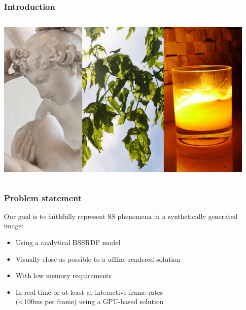 \documentclass{beamer}
\begin{document}
\begin{frame}
    \frametitle{Introduction}
\begin{columns}[t]
    \begin{column}{\paperwidth}
      \centering
		\vspace{0.0cm}
		\includegraphics[width=\paperwidth]{comb}
\end{column}
​\end{columns}
\end{frame}

\begin{frame}
    \frametitle{Problem statement}
		Our goal is to faithfully represent SS phenomena in a synthetically generated image:
		\vspace{0.5cm}
		\begin{itemize}
			\item Using a analytical BSSRDF model \citep{IMM2013-06646}  
			\item Visually close as possible to a offline-rendered solution
			\item With low memory requirements 
			\item In real-time or at least at interactive frame rates \\(<100ms per frame) using a GPU-based solution
		\end{itemize}
\end{frame}
\end{document}
